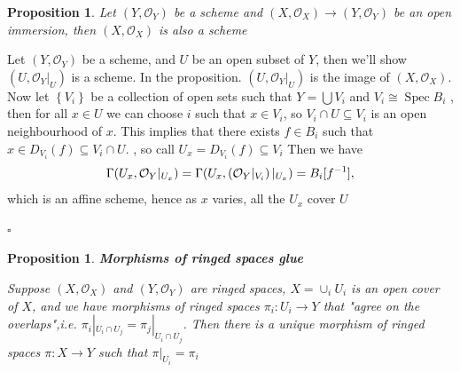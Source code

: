\documentclass{article}
\newtheorem{proposition}[theorem]{Proposition}
\newenvironment{Proof}{{\noindent \indent \it Proof:\quad}}{\hfill $\square$\par}
\begin{document}
\begin{proposition}
    Let $(Y,{\mathcal{O}}_{Y})$ be a scheme and $(X,{\mathcal{O}}_{X})\to(Y,{\mathcal{O}}_{Y})$ be an open immersion, then $(X,{\mathcal{O}}_{X})$ is also a scheme 
\end{proposition}
\begin{Proof}
    Let $(Y,{\mathcal{O}}_{Y})$ be a scheme, and $U$ be an open subset of $Y$, then we'll show $(U,{\mathcal{O}}_{Y}|_{U})$ is a scheme. In the proposition. $(U,{\mathcal{O}}_{Y}|_{U})$ is the image of $(X,{\mathcal{O}}_{X})$. Now let $\left\{{\mathit{V}}_{i}\right\}$ be a collection of open sets such that $Y=\bigcup{V}_{i}$ and $V_{i}\cong\operatorname{Spec}B_{i}$ , then for all $x\in U$ we can choose $i$ such that $x\in V_{i}$, so $V_{i}\cap U\subseteq V_{i}$ is an open neighbourhood of $x$. This implies that there exists $f\in B_{i}$ such that $x\in D_{V_{i}}(f)\subseteq V_{i}\cap U.$ , so call $U_{x}=D_{V_{i}}(f)\subseteq V_{i}$ Then we have
$$
\Gamma(U_{x},{\cal O}_{Y}|_{U_{x}})=\Gamma(U_{x},({\cal O}_{Y}|_{V_{i}})\,|_{U_{x}})=B_{i}[f^{-1}], 
$$
which is an affine scheme, hence as $x$ varies, all the $\textstyle{U_{x}}$ cover $U$
    
\end{Proof}

\begin{proposition}
    \textbf{Morphisms of ringed spaces glue}
    
    Suppose $(X,{\mathcal{O}}_{X})$ and $(Y,{\mathcal{O}}_{Y})$ are ringed spaces, $X=\cup_{i}U_i$ is an open cover of $X$, and we have morphisms of ringed spaces $\pi_{i}\colon U_{i} \rightarrow{Y}$ that "agree on the overlaps",i.e. $\pi_{i}|_{U_i\cap U_j}=\pi_{j}|_{U_i\cap U_j}$.  Then there is a unique morphism of ringed spaces $\pi\colon X\to Y$ such that $\pi|_{U_i}=\pi_{i}$
    \label{prop 3.24}
\end{proposition}
\end{document}
